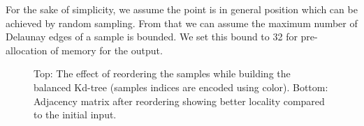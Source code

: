 \documentclass[12pt] {article}
\begin{document}
For the sake of simplicity, we assume the point is in general position which can be achieved by random sampling. From that we can assume the maximum number of Delaunay edges of a sample is bounded. We set this bound to 32 for pre-allocation of memory for the output. 

\begin{figure}[!tbh]
\centering        
   
  
   \caption{Top: The effect of reordering the samples while building the balanced Kd-tree (samples indices are encoded using color). Bottom: Adjacency matrix after reordering showing better locality compared to the initial input.}
   \label{fig:tree}
\end{figure}
\end{document}
